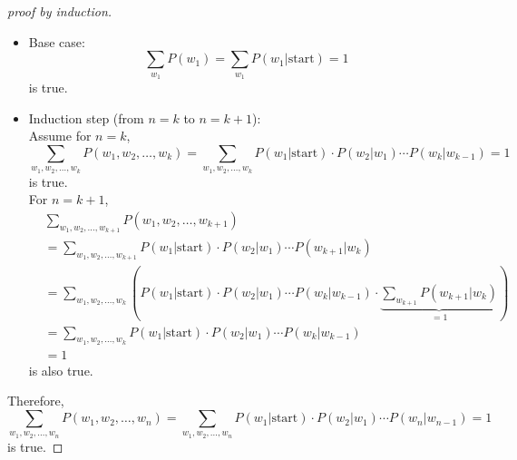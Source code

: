 \documentclass[twoside,11pt]{homework}
\begin{document}
\begin{proof}[proof by induction]
$ $
  \begin{itemize}
  \item Base case:
    \[
      \sum_{w_1} P(w_1) = \sum_{w_1} P(w_1 | \text{start}) = 1
    \]
    is true.
  \item Induction step (from $n = k$ to $n = k+1$):\\
    Assume for $n = k$,
    \[
      \sum_{w_1, w_2, \dots, w_k} P(w_1, w_2, \dots, w_k) = \sum_{w_1, w_2, \dots, w_k}
      P(w_1 | \text{start}) \cdot P(w_2 | w_1) \cdots P(w_k | w_{k-1}) = 1
    \]
    is true.\\
    For $n = k + 1$,
    \[
      \begin{aligned}
        & \sum_{w_1, w_2, \dots, w_{k+1}} P(w_1, w_2, \dots, w_{k+1})\\
        &= \sum_{w_1, w_2, \dots, w_{k+1}}
        P(w_1 | \text{start}) \cdot P(w_2 | w_1) \cdots P(w_{k+1} | w_k) \\
        &= \sum_{w_1, w_2, \dots, w_k}
        (P(w_1 | \text{start}) \cdot P(w_2 | w_1) \cdots P(w_k | w_{k-1})
        \cdot \underbrace{\sum_{w_{k+1}} P(w_{k+1}| w_k)}_{= 1})\\
        &= \sum_{w_1, w_2, \dots, w_k}
        P(w_1 | \text{start}) \cdot P(w_2 | w_1) \cdots P(w_k | w_{k-1})\\
        &= 1
      \end{aligned}
    \]
    is also true.
  \end{itemize}
  Therefore,
  \[
    \sum_{w_1, w_2, \dots, w_n} P(w_1, w_2, \dots, w_n) = \sum_{w_1, w_2, \dots, w_n}
    P(w_1 | \text{start}) \cdot P(w_2 | w_1) \cdots P(w_n | w_{n-1}) = 1
  \]
  is true.
\end{proof}
\end{document}

